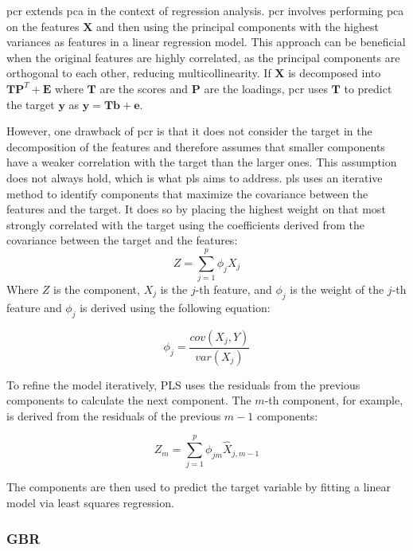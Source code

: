 \gls{pcr} extends \gls{pca} in the context of regression analysis.
\gls{pcr} involves performing \gls{pca} on the features $\mathbf{X}$ and then using the principal components with the highest variances as features in a linear regression model.
This approach can be beneficial when the original features are highly correlated, as the principal components are orthogonal to each other, reducing multicollinearity.
If $\mathbf{X}$ is decomposed into $\mathbf{TP}^T + \mathbf{E}$ where $\mathbf{T}$ are the scores and $\mathbf{P}$ are the loadings, \gls{pcr} uses $\mathbf{T}$ to predict the target $\mathbf{y}$ as $\mathbf{y} = \mathbf{Tb} + \mathbf{e}$.

However, one drawback of \gls{pcr} is that it does not consider the target in the decomposition of the features and therefore assumes that smaller components have a weaker correlation with the target than the larger ones. 
This assumption does not always hold, which is what \gls{pls} aims to address.
\gls{pls} uses an iterative method to identify components that maximize the covariance between the features and the target. 
It does so by placing the highest weight on that most strongly correlated with the target using the coefficients derived from the covariance between the target and the features:
$$
    Z = \sum_{j=1}^{p} \phi_j X_j 
$$
Where $Z$ is the component, $X_j$ is the $j$-th feature, and $\phi_j$ is the weight of the $j$-th feature and $\phi_j$ is derived using the following equation:

$$
    \phi_j = \frac{cov(X_j, Y)}{var(X_j)}
$$

To refine the model iteratively, PLS uses the residuals from the previous components to calculate the next component. The $m$-th component, for example, is derived from the residuals of the previous $m-1$ components:

$$
    Z_m = \sum_{j=1}^{p} \phi_{jm} \hat{X}_{j, m-1}
$$

The components are then used to predict the target variable by fitting a linear model via least squares regression.


\subsubsection{GBR} %


